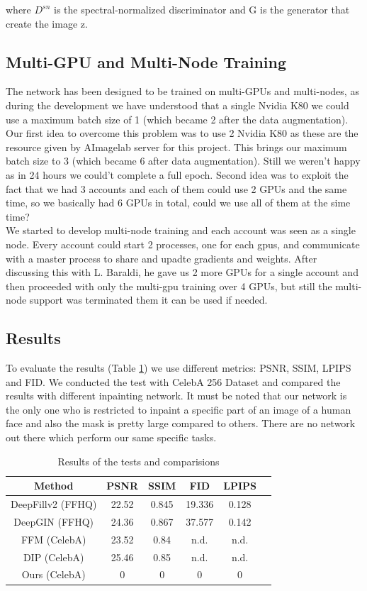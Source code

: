 \documentclass[10pt,twocolumn,letterpaper]{article}
\begin{document}
where \(D^{sn}\) is the spectral-normalized discriminator and G is the generator
that create the image z.

\subsection{Multi-GPU and Multi-Node Training}
The network has been designed to be trained on multi-GPUs and multi-nodes, as
during the development we have understood that a single Nvidia K80  we could use
a maximum batch size of 1 (which became 2 after the data augmentation). Our
first idea to overcome this problem was to use 2 Nvidia K80 as these are the
resource given by AImagelab server for this project. This brings our maximum
batch size to 3 (which became 6 after data augmentation). Still we weren't happy
as in 24 hours we could't complete a full epoch. Second idea was to exploit the
fact that we had 3 accounts and each of them could use 2 GPUs and the same time,
so we basically had 6 GPUs in total, could we use all of them at the sime
time?\\
We started to develop multi-node training and each account was seen as a single
node. Every account could start 2 processes, one for each gpus, and communicate
with a master process to share and upadte gradients and weights. After
discussing this with L. Baraldi, he gave us 2 more GPUs for a single account and
then proceeded with only the multi-gpu training over 4 GPUs, but still the
multi-node support was terminated them it can be used if needed.

\subsection{Results}
To evaluate the results (Table \ref{tab:results}) we use different metrics:
PSNR, SSIM, LPIPS and FID. We conducted the test with CelebA 256 Dataset and
compared the results with different inpainting network. It must be noted that
our network is the only one who is restricted to inpaint a specific part of an
image of a human face and also the mask is pretty large compared to others.
There are no network out there which perform our same specific tasks.
\begin{table}
  \begin{tabular}{|c|c|c|c|c|c|}
    \hline
    Method & PSNR & SSIM & FID & LPIPS \\
    \hline
    DeepFillv2 (FFHQ) & 22.52 & 0.845 & 19.336  & 0.128 \\
    DeepGIN (FFHQ)    & 24.36 & 0.867 & 37.577  & 0.142 \\
    FFM (CelebA)      & 23.52 & 0.84  & n.d.    & n.d. \\
    DIP (CelebA)      & 25.46 & 0.85  & n.d.    & n.d. \\
    Ours (CelebA)     & 0     & 0     & 0       & 0 \\
  \hline
  \end{tabular}
  \\
  \caption{Results of the tests and comparisions}
  \label{tab:results}
\end{table}
\end{document}
